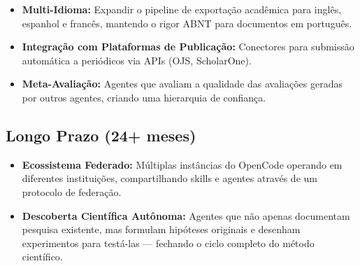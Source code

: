 \begin{itemize}
  \item \textbf{Multi-Idioma:} Expandir o pipeline de exportação acadêmica para inglês, espanhol e francês, mantendo o rigor ABNT para documentos em português.
  \item \textbf{Integração com Plataformas de Publicação:} Conectores para submissão automática a periódicos via APIs (OJS, ScholarOne).
  \item \textbf{Meta-Avaliação:} Agentes que avaliam a qualidade das avaliações geradas por outros agentes, criando uma hierarquia de confiança.
\end{itemize}

\subsection{Longo Prazo (24+ meses)}

\begin{itemize}
  \item \textbf{Ecossistema Federado:} Múltiplas instâncias do OpenCode operando em diferentes instituições, compartilhando skills e agentes através de um protocolo de federação.
  \item \textbf{Descoberta Científica Autônoma:} Agentes que não apenas documentam pesquisa existente, mas formulam hipóteses originais e desenham experimentos para testá-las --- fechando o ciclo completo do método científico.
\end{itemize}

\newpage
